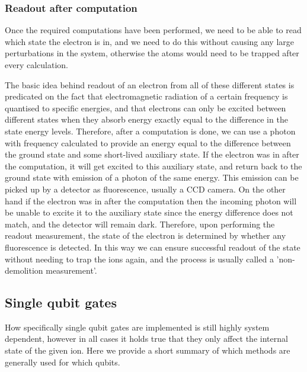 \subsubsection{Readout after computation}
Once the required computations have been performed, we need to be able to read which state the electron is in, and we need to do this without causing any large perturbations in the system, otherwise the atoms would need to be trapped after every calculation. 

The basic idea behind readout of an electron from all of these different states is predicated on the fact that electromagnetic radiation of a certain frequency is quantised to specific energies, and that electrons can only be excited between different states when they absorb energy exactly equal to the difference in the state energy levels. Therefore, after a computation is done, we can use a photon with frequency calculated to provide an energy equal to the difference between the ground state \kz and some short-lived auxiliary state. If the electron was in \kz after the computation, it will get excited to this auxiliary state, and return back to the ground state with emission of a photon of the same energy. This emission can be picked up by a detector as fluorescence, usually a CCD camera. On the other hand if the electron was in \ko after the computation then the incoming photon will be unable to excite it to the auxiliary state since the energy difference does not match, and the detector will remain dark. Therefore, upon performing the readout measurement, the state of the electron is determined by whether any fluorescence is detected. In this way we can ensure successful readout of the state without needing to trap the ions again, and the process is usually called a 'non-demolition measurement'.

\subsection{Single qubit gates}
How specifically single qubit gates are implemented is still highly system dependent, however in all cases it holds true that they only affect the internal state of the given ion.
Here we provide a short summary of which methods are generally used for which qubits.

